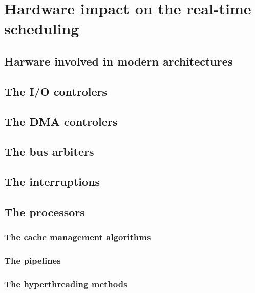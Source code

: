 
\chapter{Hardware impact on the real-time scheduling}
\doMinitoc

\section{Harware involved in modern architectures}

\section{The I/O controlers}

\section{The DMA controlers}

\section{The bus arbiters}

\section{The interruptions}

\section{The processors}

\subsection{The cache management algorithms}

\subsection{The pipelines}

\subsection{The hyperthreading methods}

